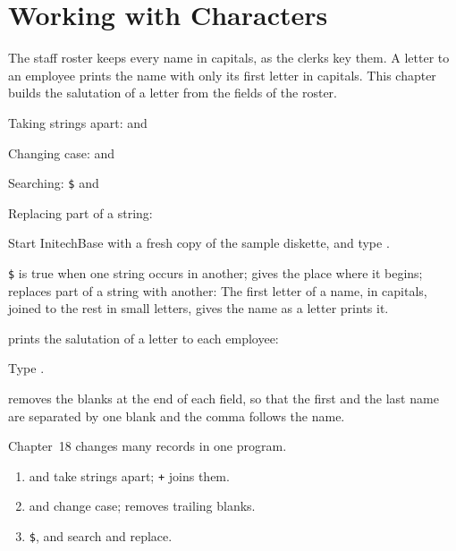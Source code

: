 \chapter{Working with Characters}
The staff roster keeps every name in capitals, as the clerks key them.  A
letter to an employee prints the name with only its first letter in capitals.
This chapter builds the salutation of a letter from the fields of the roster.

\begin{ChapterCovers}
\item Taking strings apart:  and 
\item Changing case:  and 
\item Searching: \texttt{\$} and 
\item Replacing part of a string: 
\end{ChapterCovers}

Start InitechBase with a fresh copy of the sample diskette, and type
.

\texttt{\$} is true when one string occurs in another;  gives the place
where it begins;  replaces part of a string with another:
The first letter of a name, in capitals, joined to the rest in small letters,
gives the name as a letter prints it.

 prints the salutation of a letter to each employee:
\begin{Steps}
\item Type .
\end{Steps}
 removes the blanks at the end of each field, so that the first and
the last name are separated by one blank and the comma follows the name.

Chapter~18 changes many records in one program.

\begin{enumerate}
\item {} and  take strings apart; \texttt{+} joins them.
\item {} and  change case;  removes trailing
  blanks.
\item \texttt{\$},  and  search and replace.
\end{enumerate}
